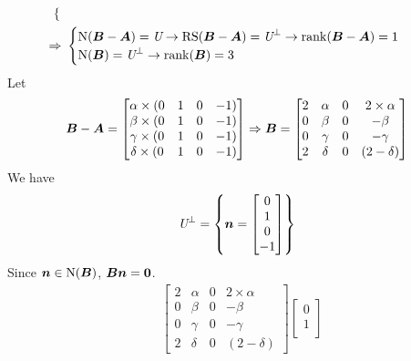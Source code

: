 \documentclass[a4paper,12pt]{article}
\begin{document}
\begin{enumerate}
\begin{equation}
\begin{aligned}
\begin{cases}
			\end{cases} \\ \Rightarrow & \ 
			\begin{cases}
				\Ker(\mat{B} - \mat{A}) = \spc{U} \rightarrow \rs(\mat{B} - \mat{A}) = \spc{U}^\perp \rightarrow \rnk(\mat{B} - \mat{A}) = 1\\
				\Ker(\mat{B}) = \spc{U}^\perp \rightarrow \rnk(\mat{B}) = 3
			\end{cases}
		\end{aligned}
	\end{equation} Let \begin{equation}
		\boldsymbol{B} - \boldsymbol{A} = \begin{bmatrix}
			\alpha \times (0 & 1 & 0 & -1 ) \\
			\beta \times (0 & 1 & 0 & -1 ) \\
			\gamma \times (0 & 1 & 0 & -1 ) \\
			\delta \times (0 & 1 & 0 & -1 ) 
		\end{bmatrix} \Rightarrow \boldsymbol{B} = \begin{bmatrix}
			2 & \alpha & 0 & 2 \times \alpha \\
			0 & \beta & 0 & -\beta \\
			0 & \gamma & 0 & -\gamma \\
			2 & \delta & 0 & (2 - \delta)
		\end{bmatrix}
	\end{equation} We have \begin{equation}
		\textit{U}^\perp = \left\{\boldsymbol{n} = \begin{bmatrix}
			0 \\
			1 \\
			0 \\
			-1
		\end{bmatrix}\right\}
	\end{equation} Since $\boldsymbol{n} \in \operatorname{N}(\boldsymbol{B})$, $\boldsymbol{B}\boldsymbol{n} = \boldsymbol{0}$. \begin{equation}
		\begin{aligned}
			& \begin{bmatrix}
				2 & \alpha & 0 & 2 \times \alpha \\
				0 & \beta & 0 & -\beta \\
				0 & \gamma & 0 & -\gamma \\
				2 & \delta & 0 & (2 - \delta)
			\end{bmatrix}\begin{bmatrix}
				0 \\
				1 \\

\end{bmatrix}
\end{aligned}
\end{equation}
\end{enumerate}
\end{document}
